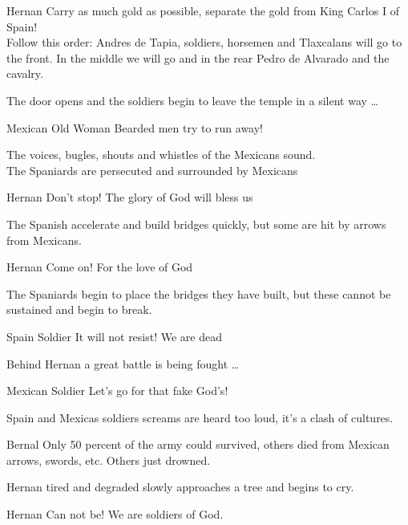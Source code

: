 \documentclass{screenplay}[2020/03/06]
\begin{document}

\begin{dialogue}{Hernan}
Carry as much gold as possible, separate the gold from King Carlos I of Spain!\\
Follow this order: Andres de Tapia, soldiers, horsemen and Tlaxcalans will go to the front. In the middle we will go and in the rear Pedro de Alvarado and the cavalry.
\end{dialogue}


The door opens and the soldiers begin to leave the temple in a silent way \dots


\begin{dialogue}[Screaming]{Mexican Old Woman}
Bearded men try to run away!
\end{dialogue}

The voices, bugles, shouts and whistles of the Mexicans sound. \\
The Spaniards are persecuted and surrounded by Mexicans

\begin{dialogue}[Screaming]{Hernan}
Don't stop! The glory of God will bless us
\end{dialogue}


The Spanish accelerate and build bridges quickly, but some are hit by arrows from Mexicans.

\begin{dialogue}{Hernan}
Come on! For the love of God
\end{dialogue}

The Spaniards begin to place the bridges they have built, but these cannot be sustained and begin to break.

\begin{dialogue}{Spain Soldier}
It will not resist! We are dead
\end{dialogue}

Behind Hernan a great battle is being fought \dots


\begin{dialogue}[Screaming]{Mexican Soldier}
Let's go for that fake God's! 
\end{dialogue}

Spain and Mexicas soldiers screams are heard too loud, it's a clash of cultures.


\begin{dialogue}{Bernal}
Only 50 percent of the army could survived, others died from Mexican arrows, swords, etc. Others just drowned.
\end{dialogue}

Hernan tired and degraded slowly approaches a tree and begins to cry.

\begin{dialogue}[Crying]{Hernan}
Can not be! We are soldiers of God.
\end{dialogue}
\end{document}
